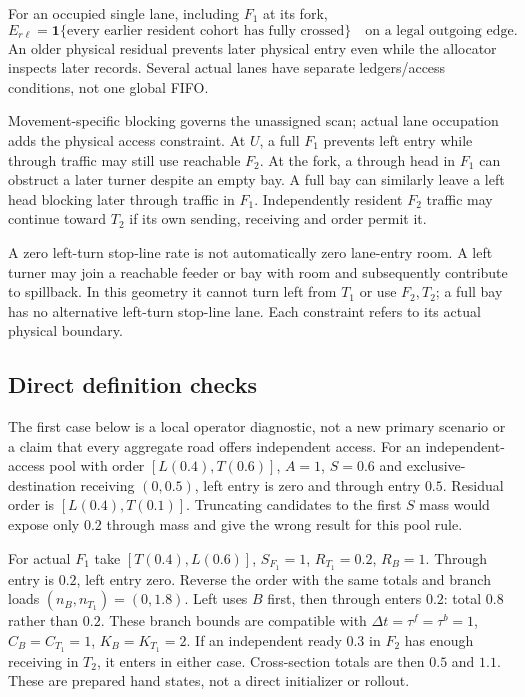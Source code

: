 \documentclass[10pt,a4paper]{article}
\begin{document}
For an occupied single lane, including $F_1$ at its fork,
\begin{equation}
 E_{r\ell}
 =\mathbf1\{\text{every earlier resident cohort has fully crossed}\}
 \quad\text{on a legal outgoing edge}.
 \label{eq:physical-access}
\end{equation}
An older physical residual prevents later physical entry even while the
allocator inspects later records. Several actual lanes have separate
ledgers/access conditions, not one global FIFO.

Movement-specific blocking governs the unassigned scan; actual lane
occupation adds the physical access constraint. At $U$, a full $F_1$
prevents left entry while through traffic may still use reachable $F_2$.
At the fork, a through head in $F_1$ can obstruct a later turner despite
an empty bay. A full bay can similarly leave a left head blocking later
through traffic in $F_1$. Independently resident $F_2$ traffic may continue
toward $T_2$ if its own sending, receiving and order permit it.

A zero left-turn stop-line rate is not automatically zero lane-entry room.
A left turner may join a reachable feeder or bay with room and subsequently
contribute to spillback. In this geometry it cannot turn left from $T_1$
or use $F_2,T_2$; a full bay has no alternative left-turn stop-line lane.
Each constraint refers to its actual physical boundary.

\subsection*{Direct definition checks}

The first case below is a local operator diagnostic, not a new primary
scenario or a claim that every aggregate road offers independent access.
For an independent-access pool with order $[L(0.4),T(0.6)]$, $A=1$,
$S=0.6$ and exclusive-destination receiving $(0,0.5)$, left entry is
zero and through entry $0.5$. Residual order is $[L(0.4),T(0.1)]$.
Truncating candidates to the first $S$ mass would expose only $0.2$
through mass and give the wrong result for this pool rule.

For actual $F_1$ take $[T(0.4),L(0.6)]$, $S_{F_1}=1$, $R_{T_1}=0.2$,
$R_B=1$. Through entry is $0.2$, left entry zero.
Reverse the order with the same totals and branch loads
$(n_B,n_{T_1})=(0,1.8)$. Left uses $B$ first, then through enters $0.2$:
total $0.8$ rather than $0.2$.
These branch bounds are compatible with
$\Delta t=\tau^f=\tau^b=1$, $C_B=C_{T_1}=1$, $K_B=K_{T_1}=2$.
If an independent ready $0.3$ in $F_2$ has enough receiving in $T_2$,
it enters in either case. Cross-section totals are then $0.5$ and $1.1$.
These are prepared hand states, not a direct initializer or rollout.
\end{document}
